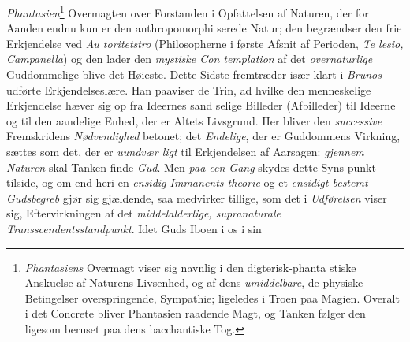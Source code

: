 \emph{Phantasien}\footnote{\emph{Phantasiens} Overmagt viser sig navnlig i den digterisk-phanta\-%
stiske Anskuelse af Naturens Livsenhed, og af dens \emph{umiddelbare},
de physiske Betingelser overspringende, Sympathie; ligeledes i Troen
paa Magien. Overalt i det Concrete bliver Phantasien raadende
Magt, og Tanken følger den ligesom beruset paa dens bacchantiske
Tog.} Overmagten over Forstanden i Opfattelsen af
Naturen, der for Aanden endnu kun er den anthropomorphi\-%
serede Natur; den begrændser den frie Erkjendelse ved \emph{Au\-%
toritetstro} (Philosopherne i første Afsnit af Perioden, \emph{Te\-%
lesio, Campanella}) og den lader den \emph{mystiske Con\-%
templation} af det \emph{overnaturlige} Guddommelige blive
det Høieste. Dette Sidste fremtræder især klart i \emph{Brunos}
udførte Erkjendelseslære. Han paaviser de Trin, ad hvilke
den menneskelige Erkjendelse hæver sig op fra Ideernes sand\-%
selige Billeder (Afbilleder) til Ideerne og til den aandelige
Enhed, der er Altets Livsgrund. Her bliver den \emph{successive}
Fremskridens \emph{Nødvendighed} betonet; det \emph{Endelige}, der
er Guddommens Virkning, sættes som det, der er \emph{uundvær\-%
ligt} til Erkjendelsen af Aarsagen: \emph{gjennem Naturen} skal
Tanken finde \emph{Gud}. Men \emph{paa een Gang} skydes dette Syns\-%
punkt tilside, og om end heri en \emph{ensidig Immanents\-%
theorie} og et \emph{ensidigt bestemt Gudsbegreb} gjør sig
gjældende, saa medvirker tillige, som det i \emph{Udførelsen} viser
sig, Eftervirkningen af det \emph{middelalderlige, supranaturale}
\emph{Transscendentsstandpunkt}. Idet Guds Iboen i os i sin
